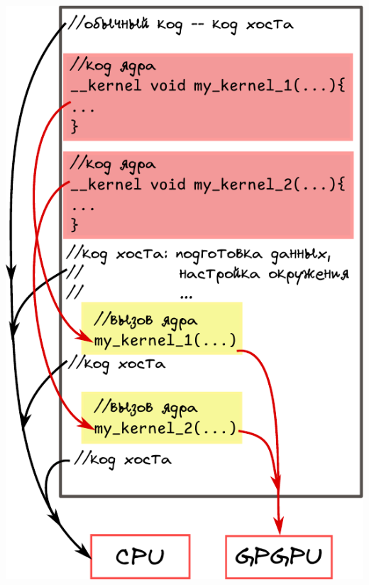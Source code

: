 \documentclass[
    aspectratio=169,
]{beamer}
\begin{document}
\begin{frame}
\begin{columns}[T]
\begin{column}{0.3\textwidth}
            \includegraphics[width=0.9\linewidth]{host-kernel-code.pdf}
        \end{column}
    \end{columns}
\end{frame}
\end{document}
